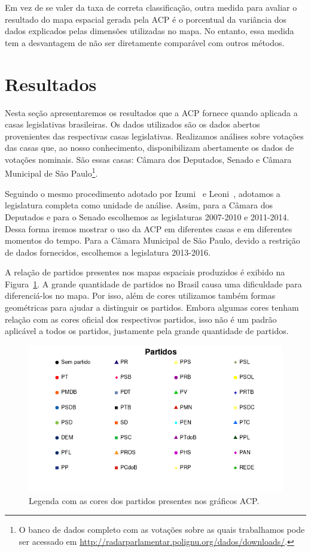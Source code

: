\documentclass[a4paper, 12pt]{article}
\begin{document}
Em vez de se valer da taxa de correta classificação, outra medida para avaliar o resultado do mapa espacial gerada pela ACP é o porcentual da variância dos dados explicados pelas dimensões utilizadas no mapa. No entanto, essa medida tem a desvantagem de não ser diretamente comparável com outros métodos.


\section{Resultados}
\label{sec:resultados}

Nesta seção apresentaremos os resultados que a ACP fornece quando aplicada a casas legislativas brasileiras. Os dados utilizados são os dados abertos provenientes das respectivas casas legislativas. Realizamos análises sobre votações das casas que, ao nosso conhecimento, disponibilizam abertamente os dados de votações nominais. São essas casas: Câmara dos Deputados, Senado e Câmara Municipal de São Paulo\footnote{O banco de dados completo com as votações sobre as quais trabalhamos pode ser acessado em \url{http://radarparlamentar.polignu.org/dados/downloads/}.}.

Seguindo o mesmo procedimento adotado por Izumi~\cite{izumi2016senado} e Leoni~\cite{leoni02cdep}, adotamos a legislatura completa como unidade de análise. Assim, para a Câmara dos Deputados e para o Senado escolhemos as legislaturas 2007-2010 e 2011-2014. Dessa forma iremos mostrar o uso da ACP em diferentes casas e em diferentes momentos do tempo. Para a Câmara Municipal de São Paulo, devido a restrição de dados fornecidos, escolhemos a legislatura 2013-2016. 

A relação de partidos presentes nos mapas espaciais produzidos é exibido na Figura~\ref{fig:partidos}. A grande quantidade de partidos no Brasil causa uma dificuldade para diferenciá-los no mapa. Por isso, além de cores utilizamos também formas geométricas para ajudar a distinguir os partidos. Embora algumas cores tenham relação com as cores oficial dos respectivos partidos, isso não é um padrão aplicável a todos os partidos, justamente pela grande quantidade de partidos.

\begin{figure}[h!]
  \centering
  \includegraphics[scale=0.8]{figs/partidos.png}
  \caption{Legenda com as cores dos partidos presentes nos gráficos ACP.}
  \label{fig:partidos}
\end{figure}
\end{document}
